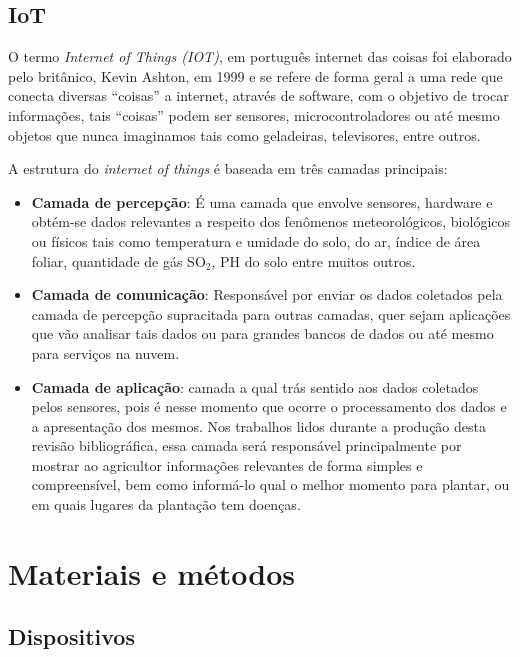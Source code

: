 \documentclass[
article,			%
12pt,				%
oneside,			%
a4paper,			%
english,			%
brazil,				%
sumario=tradicional
]{abntex2}
\begin{document}
\subsection{IoT}\label{IoT}
O termo \textit{Internet of Things (IOT)}, em português internet das coisas foi elaborado pelo britânico, Kevin Ashton, em 1999\cite{tzounis2017internet} e se refere de forma geral a uma rede que conecta diversas ``coisas'' a internet, através de software, com o objetivo de trocar informações\cite{defIot}, tais ``coisas'' podem ser sensores, microcontroladores ou até mesmo objetos que nunca imaginamos tais como geladeiras, televisores, entre outros.

A estrutura do \textit{internet of things} é baseada em três camadas principais\cite{tzounis2017internet}:
\begin{itemize}
	\item \textbf{Camada de percepção}: É uma camada que envolve sensores, hardware e obtém-se dados relevantes a respeito dos fenômenos meteorológicos, biológicos ou físicos tais como  temperatura e umidade do solo\cite{kizito2008frequency}, do ar\cite{mesas2015open}, índice de área foliar\cite{bauer2016potential}, quantidade de gás SO$_{2}$\cite{karimi2018web}, PH do solo\cite{karimi2018web} entre muitos outros.
	\item \textbf{Camada de comunicação}: Responsável por enviar os dados coletados pela camada de percepção supracitada para outras camadas, quer sejam aplicações que vão analisar tais dados ou para grandes bancos de dados ou até mesmo para serviços na nuvem.
	\item \textbf{Camada de aplicação}: camada a qual trás sentido aos dados coletados pelos sensores, pois é nesse momento que ocorre o processamento dos dados e a apresentação dos mesmos. Nos trabalhos lidos durante a produção desta revisão bibliográfica, essa camada será responsável principalmente por mostrar ao agricultor informações relevantes de forma simples e compreensível, bem como informá-lo qual o melhor momento para plantar\cite{kath2019soil}, ou em quais lugares da plantação tem doenças\cite{trilles2019development}.
\end{itemize}

\cleardoublepage
\section{Materiais e métodos}\label{Materiais e métodos}
\subsection{Dispositivos}\label{Dispositivos}
\end{document}
